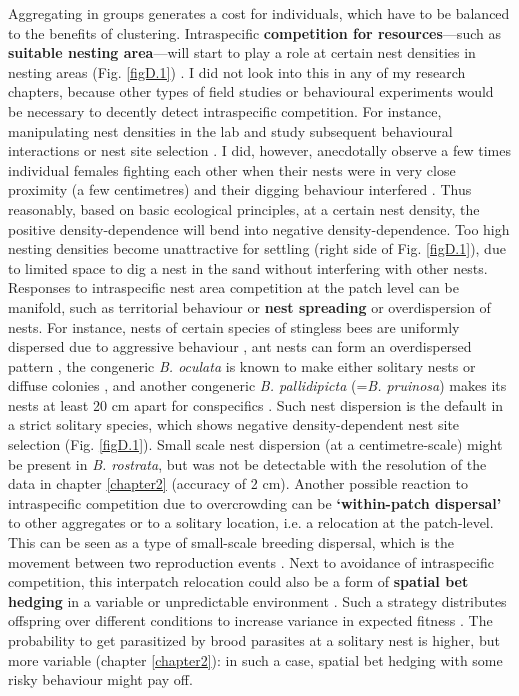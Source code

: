 \documentclass[10pt, twoside]{book} %
\begin{document}
	Aggregating in groups generates a cost for individuals, which have to be balanced to the benefits of clustering. Intraspecific \textbf{competition for resources}---such as \textbf{suitable nesting area}---will start to play a role at certain nest densities in nesting areas (Fig. \ref{figD.1}) \citep{polidori2006, dann2006}. I did not look into this in any of my research chapters, because other types of field studies or behavioural experiments would be necessary to decently detect intraspecific competition. For instance, manipulating nest densities in the lab and study subsequent behavioural interactions or nest site selection \citep[with e.g. the hypothesis of density-dependent fighting;][]{lin1963}. I did, however, anecdotally observe a few times individual females fighting each other when their nests were in very close proximity (a few centimetres) and their digging behaviour interfered \citep[also reported by][]{evans1957}. Thus reasonably, based on basic ecological principles, at a certain nest density, the positive density-dependence will bend into negative density-dependence. Too high nesting densities become unattractive for settling (right side of Fig. \ref{figD.1}), due to limited space to dig a nest in the sand without interfering with other nests.\\
	
	Responses to intraspecific nest area competition at the patch level can be manifold, such as territorial behaviour or \textbf{nest spreading} or overdispersion of nests. For instance, nests of certain species of stingless bees are uniformly dispersed due to aggressive behaviour \citep{hubbell1977}, ant nests can form an overdispersed pattern \citep{ryti1986}, the congeneric \textit{B. oculata} is known to make either solitary nests or diffuse colonies \citep{asis1992}, and another congeneric\textit{ B. pallidipicta} (=\textit{B. pruinosa}) makes its nests at least 20 cm apart for conspecifics \citep{evans1957, rubink1982}. Such nest dispersion is the default in a strict solitary species, which shows negative density-dependent nest site selection (Fig. \ref{figD.1}). Small scale nest dispersion (at a centimetre-scale) might be present in \textit{B. rostrata}, but was not be detectable with the resolution of the data in chapter \ref{chapter2} (accuracy of 2 cm). Another possible reaction to intraspecific competition due to overcrowding can be \textbf{`within-patch dispersal'} to other aggregates or to a solitary location, i.e. a relocation at the patch-level. This can be seen as a type of small-scale breeding dispersal, which is the movement between two reproduction events \citep{ronce2007}. Next to avoidance of intraspecific competition, this interpatch relocation could also be a form of \textbf{spatial bet hedging} in a variable or unpredictable environment \citep{philippi1989, bowler2005}. Such a strategy distributes offspring over different conditions to increase variance in expected fitness \citep{matthysen2012}. The probability to get parasitized by brood parasites at a solitary nest is higher, but more variable (chapter \ref{chapter2}): in such a case, spatial bet hedging with some risky behaviour might pay off.\\
	
\end{document}
